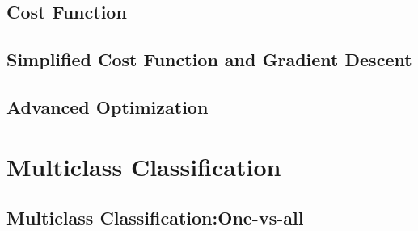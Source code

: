 \documentclass{article}
\begin{document}
\begin{CJK}{UTF8}{gbsn}
\subsection{Cost Function}

\subsection{Simplified Cost Function and Gradient Descent}
\subsection{Advanced Optimization} 

\section{Multiclass Classification}
\subsection{Multiclass Classification:One-vs-all}
\subparagraph*{}
\end{CJK}
\end{document}
